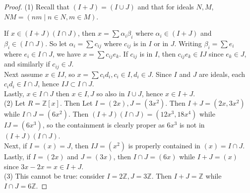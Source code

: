 \documentclass[reqno]{amsart}
\theoremstyle{definition}
\theoremstyle{remark}
\begin{document}
\begin{proof}
    (1) Recall that
    $\left( I+J \right) = 
    \left( I \cup J \right) $ and that
    for ideals $N,M$, 
    $NM = \left( nm  \mid n \in N, m \in M \right) $.

    If $x \in \left( I+J \right) \left( I \cap J \right) $, then
    $x = \sum \alpha_i \beta_i$ where
    $\alpha_i \in \left( I+J \right) $ and
    $\beta_i \in \left( I \cap J \right) $.
    So let $\alpha_i = \sum c_{ij}$ where
    $c_{ij}$ is in $I$ or in $J$. Writing
    $\beta_i = \sum e_i$ where
    $e_i \in I \cap J$, we have
    $x = \sum c_{ij} e_k$. If
    $c_{ij}$ is in $I$, then
    $c_{ij} e_k \in IJ$ since
    $e_k \in J$, and similarly if  $c_{ij} \in J$.\\
    \linebreak
    Next assume $x \in IJ$, so
    $x = \sum c_i d_i, c_i \in I, d_i \in J$.
    Since $I$ and $J$ are ideals, 
    each $c_i d_i \in I \cap J$, hence
    $IJ \subset I \cap J$.\\
    \linebreak
    Lastly, 
    $x \in I \cap J$ then
    $x \in I,J$ so also in
    $I \cup  J$, hence
    $x \in  I + J$.\\
    \linebreak
    (2) Let $R = \mathbb{Z}[x]$. Then
    Let $I = (2x), J = (3x^2)$. Then
    $I + J = (2x, 3x^2)$ while
    $I \cap J = \left( 6x^2 \right) $. 
    Then 
    $\left( I+J \right) 
    \left( I \cap J \right) 
    = \left( 12 x^3,18x^{4} \right) $ while
    $IJ = \left( 6x^3 \right) $, so the containment
    is clearly proper as
    $6x^3$ is not in
    $\left( I+J \right) \left( I \cap J \right) $.\\
    Next, if $I = (x) = J$, then
    $IJ = (x^2)$ is properly contained in
    $(x) = I \cap J$.\\
    Lastly, if $I = (2x)$ and
    $J = (3x)$, then
    $I \cap J = (6x)$ while
    $I + J = (x)$ since
    $3x - 2x = x \in I + J$.\\
    \linebreak
    (3) This cannot be true: 
     consider $I = 2\mathbb{Z}, J = 3\mathbb{Z}$. Then
     $I + J = \mathbb{Z}$ while
     $I \cap J = 6\mathbb{Z}$.
    
\end{proof}
\end{document}
